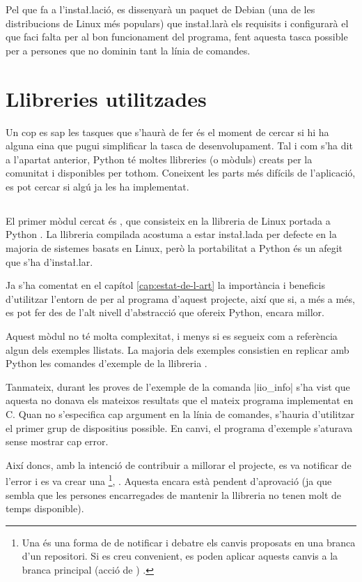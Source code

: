 Pel que fa a l'insta\l.lació, es dissenyarà un paquet de Debian (una de les
distribucions de Linux més populars) que insta\l.larà els requisits i configurarà
el que faci falta per al bon funcionament del programa, fent aquesta tasca
possible per a persones que no dominin tant la línia de comandes.

\section{Llibreries utilitzades}

Un cop es sap les tasques que s'haurà de fer és el moment de cercar si hi ha
alguna eina que pugui simplificar la tasca de desenvolupament. Tal i com s'ha dit
a l'apartat anterior, Python té moltes llibreries (o mòduls) creats per la
comunitat i disponibles per tothom. Coneixent les parts més difícils de
l'aplicació, es pot cercar si algú ja les ha implementat.

\subsection{}

El primer mòdul cercat és , que consisteix en la llibreria de
Linux  portada a Python \cite{Libiio}. La llibreria compilada acostuma
a estar insta\l.lada per defecte en la majoria de sistemes basats en Linux, però
la portabilitat a Python és un afegit que s'ha d'insta\l.lar.

Ja s'ha comentat en el capítol \ref{cap:estat-de-l-art} la importància
i beneficis d'utilitzar l'entorn de  per al programa d'aquest projecte,
així que si, a més a més, es pot fer des de l'alt nivell d'abstracció que ofereix
Python, encara millor.

Aquest mòdul no té molta complexitat, i menys si es segueix com a referència
algun dels exemples llistats. La majoria dels exemples consistien en replicar
amb Python les comandes d'exemple de la llibreria .

Tanmateix, durant les proves de l'exemple de la comanda \ord|iio_info| s'ha
vist que aquesta no donava els mateixos resultats que el mateix programa implementat
en C. Quan no s'especifica cap argument en la línia de comandes, s'hauria 
d'utilitzar el primer grup de dispositius possible. En canvi, el programa d'exemple
s'aturava sense mostrar cap error.

Així doncs, amb la intenció de contribuir a millorar el projecte, es va
notificar de l'error i es va crear una 
\footnote{
    Una  és una forma de  de notificar i debatre
    els canvis proposats en una branca d'un repositori. Si es creu convenient,
    es poden aplicar aquests canvis a la branca principal (acció de )
    \cite{PullRequest}.
}, \cite{LibiioPR}. Aquesta encara està pendent d'aprovació (ja que sembla que
les persones encarregades de mantenir la llibreria no tenen molt de temps
disponible).

